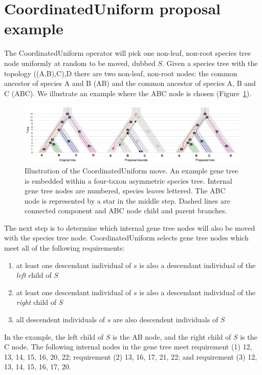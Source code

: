 \documentclass[12pt]{article}
\begin{document}
\section{CoordinatedUniform proposal example}

The CoordinatedUniform operator will pick one non-leaf, non-root species tree
node uniformly at random to be moved, dubbed $S$. Given a species tree with
the topology ((A,B),C),D there are two non-leaf, non-root nodes: the common
ancestor of species A and B (AB) and the common ancestor of species A, B and C
(ABC). We illustrate an example where the ABC node is chosen
(Figure~\ref{fig:coordinatedUniform}).

\begin{figure}[htb!]
\centering
\includegraphics[width=\textwidth]{coordinated_uniform.pdf}
\caption
{Illustration of the CoordinatedUniform move. An example gene tree is embedded
within a four-taxon asymmetric species tree. Internal gene tree nodes
are numbered, species leaves lettered. The ABC node is represented by a star
in the middle step. Dashed lines are connected component and ABC
node child and parent branches.}
\label{fig:coordinatedUniform}
\end{figure}

The next step is to determine which internal gene tree nodes will also be
moved with the species tree node. CoordinatedUniform selects gene tree nodes
which meet all of the following requirements:

\begin{enumerate}
\item at least one descendant individual of $s$ is also a
descendant individual of the \textit{left} child of $S$
\item at least one descendant individual of $s$ is also a
descendant individual of the \textit{right} child of $S$
\item all descendent individuals of $s$ are also
descendent individuals of $S$
\end{enumerate}

In the example, the left child of $S$ is the AB node, and the right child of
$S$ is the C node. The following internal nodes in the gene tree meet
requirement (1) 12, 13, 14, 15, 16, 20, 22; requirement (2) 13, 16, 17, 21,
22; and requirement (3) 12, 13, 14, 15, 16, 17, 20.
\end{document}
